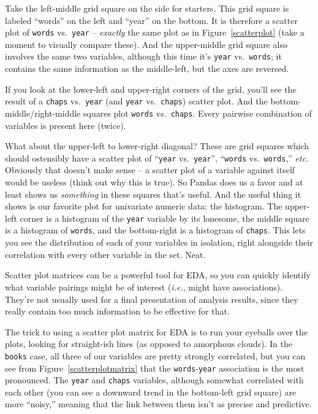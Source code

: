 Take the left-middle grid square on the side for starters. This grid square is
labeled ``words'' on the left and ``year'' on the bottom. It is therefore a
scatter plot of \texttt{words} vs.~\texttt{year} -- \textit{exactly} the same
plot as in Figure~\ref{scatterplot} (take a moment to visually compare these).
And the upper-middle grid square also involves the same two variables, although
this time it's \texttt{year} vs.~\texttt{words}; it contains the same
information as the middle-left, but the axes are reversed.

If you look at the lower-left and upper-right corners of the grid, you'll see
the result of a \texttt{chaps} vs.~\texttt{year} (and \texttt{year}
vs.~\texttt{chaps}) scatter plot. And the bottom-middle/right-middle squares
plot \texttt{words} vs.~\texttt{chaps}. Every pairwise combination of variables
is present here (twice).


What about the upper-left to lower-right diagonal? These are grid squares which
should ostensibly have a scatter plot of ``\texttt{year} vs.~\texttt{year}'',
``\texttt{words} vs.~\texttt{words},'' \textit{etc.} Obviously that doesn't
make sense -- a scatter plot of a variable against itself would be useless
(think out why this is true). So Pandas does us a favor and at least shows
us \textit{something} in these squares that's useful. And the useful thing it
shows is our favorite plot for univariate numeric data: the histogram. The
upper-left corner is a histogram of the \texttt{year} variable by its lonesome,
the middle square is a histogram of \texttt{words}, and the bottom-right is a
histogram of \texttt{chaps}. This lets you see the distribution of each of your
variables in isolation, right alongside their correlation with every other
variable in the set. Neat.

Scatter plot matrices can be a powerful tool for EDA, so you can quickly
identify what variable pairings might be of interest (\textit{i.e.}, might have
associations). They're not usually used for a final presentation of analysis
results, since they really contain too much information to be effective for
that.

The trick to using a scatter plot matrix for EDA is to run your eyeballs over
the plots, looking for straight-ish lines (as opposed to amorphous clouds). In
the \texttt{books} case, all three of our variables are pretty strongly
correlated, but you can see from Figure~\ref{scatterplotmatrix} that the
\texttt{words}-\texttt{year} association is the most pronounced. The
\texttt{year} and \texttt{chaps} variables, although somewhat correlated with
each other (you can see a downward trend in the bottom-left grid square) are
more ``noisy,'' meaning that the link between them isn't as precise and
predictive.

